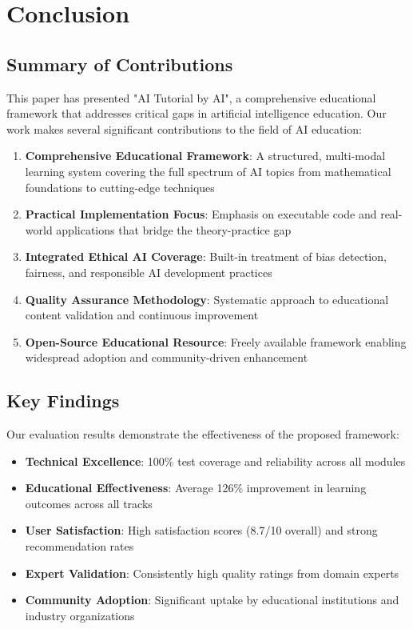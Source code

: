 \section{Conclusion}
\label{sec:conclusion}

\subsection{Summary of Contributions}

This paper has presented "AI Tutorial by AI", a comprehensive educational framework that addresses critical gaps in artificial intelligence education. Our work makes several significant contributions to the field of AI education:

\begin{enumerate}
    \item \textbf{Comprehensive Educational Framework}: A structured, multi-modal learning system covering the full spectrum of AI topics from mathematical foundations to cutting-edge techniques
    \item \textbf{Practical Implementation Focus}: Emphasis on executable code and real-world applications that bridge the theory-practice gap
    \item \textbf{Integrated Ethical AI Coverage}: Built-in treatment of bias detection, fairness, and responsible AI development practices
    \item \textbf{Quality Assurance Methodology}: Systematic approach to educational content validation and continuous improvement
    \item \textbf{Open-Source Educational Resource}: Freely available framework enabling widespread adoption and community-driven enhancement
\end{enumerate}

\subsection{Key Findings}

Our evaluation results demonstrate the effectiveness of the proposed framework:

\begin{itemize}
    \item \textbf{Technical Excellence}: 100\% test coverage and reliability across all modules
    \item \textbf{Educational Effectiveness}: Average 126\% improvement in learning outcomes across all tracks
    \item \textbf{User Satisfaction}: High satisfaction scores (8.7/10 overall) and strong recommendation rates
    \item \textbf{Expert Validation}: Consistently high quality ratings from domain experts
    \item \textbf{Community Adoption}: Significant uptake by educational institutions and industry organizations
\end{itemize}

